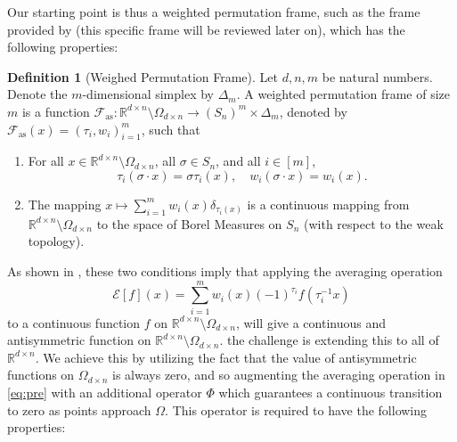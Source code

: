 \documentclass{amsart}
\theoremstyle{plain}
\theoremstyle{definition}
\newtheorem{defn}[theorem]{Definition}
\theoremstyle{remark}
\newcommand{\RR}{\mathbb{R}}
\begin{document}
Our starting point is thus a weighted permutation frame, such as the frame provided by \cite{frames} (this specific frame will be reviewed later on), which has the following properties:

\begin{defn}[Weighed Permutation Frame]\label{def:WPF}
Let $d,n,m$ be natural numbers. Denote the $m$-dimensional simplex by $\Delta_m$. A weighted permutation frame of size $m$ is a function $\mathcal{F}_{\text{as}}: \RR^{d \times n} \setminus{\Omega_{d \times n}} \to \left(S_n \right)^m \times \Delta_m$, denoted by $\mathcal{F}_{\text{as}}(x)=(\tau_i,w_i)_{i=1}^m $, such that 
\begin{enumerate}
\item  For all $x \in \RR^{d \times n}\setminus{\Omega_{d \times n}}$, all $ \sigma \in S_n$, and all $i \in [m]$,
    \begin{equation} \label{eq:frame_cond}
       \tau_i\left( \sigma \cdot x \right) = \sigma \tau_i(x), \quad
       w_i(\sigma \cdot x) = w_i(x).
\end{equation}
\item The mapping $x \mapsto \sum_{i=1}^m w_i(x)\delta_{\tau_i(x)} $ is a continuous mapping from $\RR^{d\times n}\setminus \Omega_{d\times n}$ to the space of Borel Measures on $S_n$ (with respect to the weak topology).
\end{enumerate}
\end{defn}

As shown in \cite{frames}, these two conditions imply that applying the averaging operation 
\begin{equation}\label{eq:pre}
\mathcal{E}[f](x) =\sum_{i=1}^m w_i(x)(-1)^{\tau_i}f\left( \tau_i^{-1} x \right)\end{equation}
to a continuous function $f$ on $\RR^{d\times n} \setminus \Omega_{d\times n} $, will give a continuous and antisymmetric function on $\RR^{d\times n} \setminus \Omega_{d\times n} $. the challenge is extending this to all of $\RR^{d\times n}$. We achieve this by utilizing the fact that the value of antisymmetric functions on $\Omega_{d\times n} $ is always zero, and so augmenting the averaging operation in \eqref{eq:pre} with an additional operator $\Phi$ which guarantees a continuous transition to zero as points approach $\Omega$. This operator is required to have the following properties:
\end{document}
